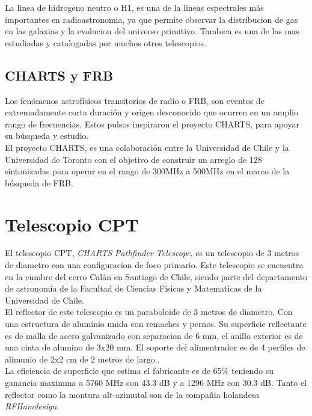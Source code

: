 La linea de hidrogeno neutro o H1, es una de la lineas espectrales más importantes en radioastronomia, ya que permite observar la distribucion de gas en las galaxias y la evolucion del universo primitivo. Tambien es una de las mas estudiadas y catalogadas por muchos otros telescopios.\\

\subsection{CHARTS y FRB}

Los fenómenos astrofísicos transitorios de radio o FRB, son eventos de extremadamente corta duración y origen desconocido que ocurren en un amplio rango de frecuencias. Estos pulsos inspiraron el proyecto CHARTS, para apoyar su búsqueda y estudio.\\

El proyecto CHARTS, es una colaboración entre la Universidad de Chile y la Universidad de Toronto con el objetivo de construir un arreglo de 128 sintonizadas para operar en el rango de 300MHz a 500MHz en el marco de la búsqueda de FRB.\\


\section{Telescopio CPT}

El telescopio CPT, \textit{CHARTS Pathfinder Telescope}, es un telescopio de 3 metros de diametro con una configuracion de foco primario. Este telescopio se encuentra en la cumbre del cerro Calán en Santiago de Chile, siendo parte del departamento de astronomia de la Facultad de Ciencias Fisicas y Matematicas de la Universidad de Chile.\\

El reflector de este telescopio es un paraboloide de 3 metros de diametro, Con una estructura de aluminio unida con remaches y pernos. Su superficie reflectante es de malla de acero galvanizado con separacion de 6 mm. el anillo exterior es de una cinta de alumino de 3x20 mm. El soporte del alimentrador es de 4 perfiles de alimunio de 2x2 cm de 2 metros de largo.\cite{rfhamdesign3meterdish}.\\

La eficiencia de superficie que estima el fabricante es de 65\% teniendo su ganancia maximma a 5760 MHz con 43.3 dB y a 1296 MHz con 30.3 dB. Tanto el reflector como la montura alt-azimutal son de la compañia holandesa \textit{RFHamdesign}.\\

